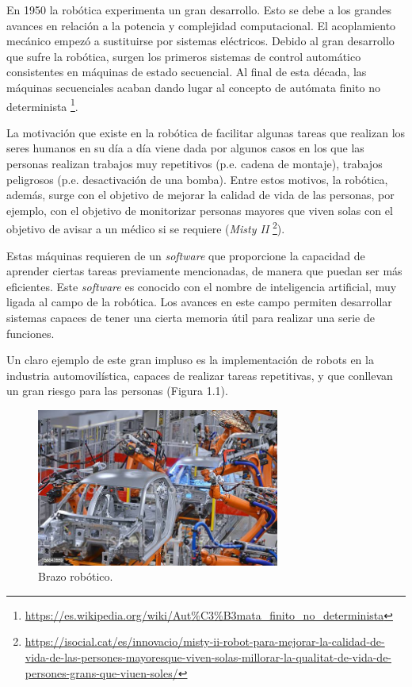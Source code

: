 \documentclass[a4paper, 12pt]{book}
\begin{document}
En 1950 la robótica experimenta un gran desarrollo. Esto se debe a los grandes avances en relación a la potencia y complejidad computacional. El acoplamiento mecánico empezó a sustituirse por sistemas eléctricos. Debido al gran desarrollo que sufre la robótica, surgen los primeros sistemas de control automático consistentes en máquinas de estado secuencial. Al final de esta década, las máquinas secuenciales acaban dando lugar al concepto de autómata finito no determinista \footnote{\url{https://es.wikipedia.org/wiki/Aut\%C3\%B3mata_finito_no_determinista}}.

La motivación que existe en la robótica de facilitar algunas tareas que realizan los seres humanos en su día a día viene dada por algunos casos en los que las personas realizan trabajos muy repetitivos (p.e. cadena de montaje), trabajos peligrosos (p.e. desactivación de una bomba). Entre estos motivos, la robótica, además, surge con el objetivo de mejorar la calidad de vida de las personas, por ejemplo, con el objetivo de monitorizar personas mayores que viven solas con el objetivo de avisar a un médico si se requiere (\emph{Misty II} \footnote{\url{https://isocial.cat/es/innovacio/misty-ii-robot-para-mejorar-la-calidad-de-vida-de-las-persones-mayoresque-viven-solas-millorar-la-qualitat-de-vida-de-persones-grans-que-viuen-soles/}}).


Estas máquinas requieren de un \emph{software} que proporcione la capacidad de aprender ciertas tareas previamente mencionadas, de manera que puedan ser más eficientes. Este \emph{software} es conocido con el nombre de inteligencia artificial, muy ligada al campo de la robótica. Los avances en este campo permiten desarrollar sistemas capaces de tener una cierta memoria útil para realizar una serie de funciones.


Un claro ejemplo de este gran impluso es la implementación de robots en la industria automovilística, capaces de realizar tareas repetitivas, y que conllevan un gran riesgo para las personas (Figura 1.1).


\begin{figure}[H]
	\centering
    \includegraphics[width=8cm, keepaspectratio]{img/brazo}
    \caption{Brazo robótico.}
    \label{figura:brazo_robotico}
\end{figure}
\end{document}
